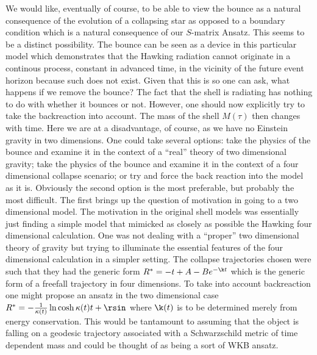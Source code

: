 We would like, eventually of course, to be able to view the bounce as a
natural consequence of the evolution of a collapsing star as opposed to
a boundary condition which is a natural consequence of our $S$-matrix
Ansatz. This seems to be a distinct possibility. The bounce can be seen
as a device in this particular model which demonstrates that the
Hawking radiation cannot originate in a continous process, constant in
advanced time, in the vicinity of the future event horizon because such
does not exist. Given that this is so one can ask, what happens if we
remove the bounce? The fact that the shell is radiating has nothing to
do with whether it bounces or not. However, one should now explicitly
try to take the backreaction into account. The mass of the shell
$M(\tau)$ then changes with time. Here we are at a disadvantage, of
course, as we have no Einstein gravity in two dimensions. One could
take several options: take the physics of the bounce and examine it in
the context of a ``real'' theory of two dimensional gravity; take the
physics of the bounce and examine it in the context of a four
dimensional collapse scenario; or try and force the back reaction into
the model as it is.  Obviously the second option is the most
preferable, but probably the most difficult. The first brings up the
question of motivation in going to a two dimensional model. The
motivation in the original shell models was essentially just finding a
simple model that mimicked as closely as possible the Hawking four
dimensional calculation. One was not dealing with a ``proper'' two
dimensional theory of gravity but trying to illuminate the essential
features of the four dimensional calculation in a simpler setting. The
collapse trajectories chosen were such that they had the generic form
$R^{\ast}=-t+A-Be^{-\k t}$ which is the generic form of a freefall
trajectory in four dimensions. To take into account backreaction one
might propose an ansatz in the two dimensional case
$R^{\ast}=-{1\over\kappa(t)}\ln\cosh\kappa(t)t+\rsin$ where $\k(t)$
is to be determined merely from
energy conservation. This would be tantamount to assuming that the
object is falling on a geodesic trajectory associated with a
Schwarzschild metric of time dependent mass and could be thought
of as being a sort of WKB ansatz.

